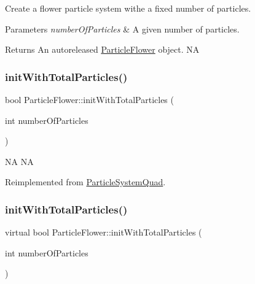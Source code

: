 Create a flower particle system withe a fixed number of particles.


\begin{DoxyParams}{Parameters}
{\em number\+Of\+Particles} & A given number of particles. \\
\hline
\end{DoxyParams}
\begin{DoxyReturn}{Returns}
An autoreleased \hyperlink{classParticleFlower}{Particle\+Flower} object.  NA 
\end{DoxyReturn}
\mbox{\label{classParticleFlower_a66c7457e917237e5a8590fc84683ff1e}} 
\subsubsection{\texorpdfstring{init\+With\+Total\+Particles()}{initWithTotalParticles()}\hspace{0.1cm}{\footnotesize\ttfamily [1/2]}}
{\footnotesize\ttfamily bool Particle\+Flower\+::init\+With\+Total\+Particles (\begin{DoxyParamCaption}\item[{int}]{number\+Of\+Particles }\end{DoxyParamCaption})\hspace{0.3cm}{\ttfamily [virtual]}}

NA  NA 

Reimplemented from \hyperlink{classParticleSystemQuad_ae5420007b57e909c05e7476a54fbfbe9}{Particle\+System\+Quad}.

\mbox{\label{classParticleFlower_adbcd387e538bdf406a27cd94c81630f9}} 
\subsubsection{\texorpdfstring{init\+With\+Total\+Particles()}{initWithTotalParticles()}\hspace{0.1cm}{\footnotesize\ttfamily [2/2]}}
{\footnotesize\ttfamily virtual bool Particle\+Flower\+::init\+With\+Total\+Particles (\begin{DoxyParamCaption}\item[{int}]{number\+Of\+Particles }\end{DoxyParamCaption})\hspace{0.3cm}{\ttfamily [virtual]}}

